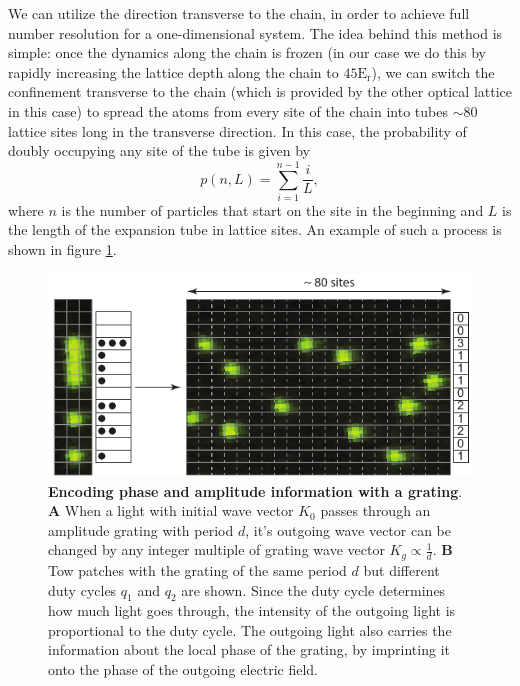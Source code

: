We can utilize the direction transverse to the chain, in order to achieve full number resolution for a one-dimensional system. The idea behind this method is simple: once the dynamics along the chain is frozen (in our case we do this by rapidly increasing the lattice depth along the chain to $45 \mathrm{E_{r}}$), we can switch the confinement transverse to the chain (which is provided by the other optical lattice in this case) to spread the atoms from every site of the chain into tubes $\sim 80$ lattice sites long in the transverse direction. In this case, the probability of doubly occupying any site of the tube is given by
\begin{equation}
p(n,L) = \sum_{i=1}^{n-1}\frac{i}{L},
\end{equation}
where $n$ is the number of particles that start on the site in the beginning and $L$ is the length of the expansion tube in lattice sites. An example of such a process is shown in figure \ref{fig:CTE_fullcounting}.

\begin{figure}[t]
	\centering
	\includegraphics[scale=1]{figures/CTE_fullcounting.pdf}
	\caption{{\bf Encoding phase and amplitude information with a grating}. {\bf A} When a light with initial wave vector $K_0$ passes through an amplitude grating with period $d$, it's outgoing wave vector can be changed by any integer multiple of grating wave vector $K_g\propto \frac{1}{d}$. {\bf B} Tow patches with the grating of the same period $d$ but different duty cycles $q_1$ and $q_2$ are shown. Since the duty cycle determines how much light goes through, the intensity of the outgoing light is proportional to the duty cycle. The outgoing light also carries the information about the local phase of the grating, by imprinting it onto the phase of the outgoing electric field.}
	\label{fig:CTE_fullcounting}
\end{figure}

